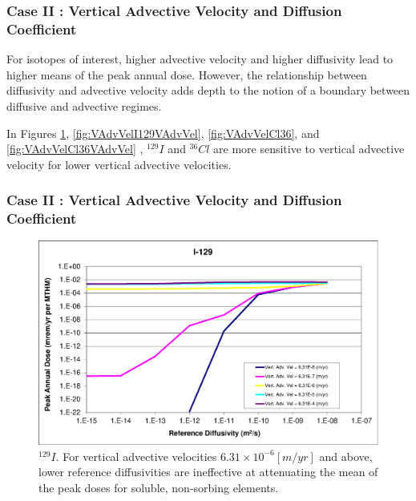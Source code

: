 \begin{frame}[c]
  \frametitle{Case II : Vertical Advective Velocity and Diffusion Coefficient}
For isotopes of interest, higher advective velocity and higher diffusivity lead to higher 
means of the peak annual dose. However, the relationship between diffusivity and 
advective velocity adds depth to the notion of a boundary between diffusive and 
advective regimes.


In Figures \ref{fig:VAdvVelI129}, \ref{fig:VAdvVelI129VAdvVel}, 
\ref{fig:VAdvVelCl36}, and \ref{fig:VAdvVelCl36VAdvVel} , $^{129}I$ and 
$^{36}Cl$ are more sensitive to vertical advective velocity for lower vertical 
advective velocities. 
\end{frame}

\begin{frame}[c]
  \frametitle{Case II : Vertical Advective Velocity and Diffusion Coefficient}
\begin{figure}[htp!]
\centering
\includegraphics[width=\linewidth]{AdvVelAndDiffCoeffEBSFail/I-129.eps}
\caption{$^{129}I$. For vertical advective velocities 
$6.31\times10^{-6}[m/yr]$ and above, lower reference diffusivities are 
ineffective at attenuating the mean of the peak doses for soluble, non-sorbing 
elements. 
}
\label{fig:VAdvVelI129}
\end{figure}
\end{frame}


